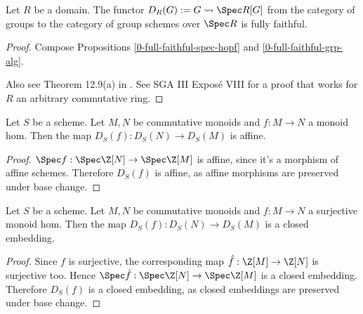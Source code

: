 \begin{theorem}
  \label{0-full-faithful-diag}
  \leanok

  Let $R$ be a domain.
  The functor $D_R(G) := G \rightsquigarrow \Spec R[G]$ from the category of groups to the category of group schemes over $\Spec R$ is fully faithful.
\end{theorem}
\begin{proof}
  \leanok

  Compose Propositions \ref{0-full-faithful-spec-hopf} and \ref{0-full-faithful-grp-alg}.

  Also see Theorem 12.9(a) in \cite{Milne_2017}. See SGA III Exposé VIII for a proof that works for $R$ an arbitrary commutative ring.
\end{proof}


\begin{proposition}
  \label{0-diag-aff-hom}

  Let $S$ be a scheme.
  Let $M, N$ be commutative monoids and $f : M \to N$ a monoid hom.
  Then the map $D_S(f) : D_S(N) \to D_S(M)$ is affine.
\end{proposition}
\begin{proof}

  $\Spec f : \Spec \Z[N] \to \Spec \Z[M]$ is affine, since it's a morphism of affine schemes.
  Therefore $D_S(f)$ is affine, as affine morphisms are preserved under base change.
\end{proof}


\begin{proposition}
  \label{0-diag-closed-emb}

  Let $S$ be a scheme.
  Let $M, N$ be commutative monoids and $f : M \to N$ a surjective monoid hom.
  Then the map $D_S(f) : D_S(N) \to D_S(M)$ is a closed embedding.
\end{proposition}
\begin{proof}

  Since $f$ is surjective, the corresponding map $\hat f : \Z[M] \to \Z[N]$ is surjective too.
  Hence $\Spec \hat f : \Spec \Z[N] \to \Spec \Z[M]$ is a closed embedding.
  Therefore $D_S(f)$ is a closed embedding, as closed embeddings are preserved under base change.
\end{proof}


